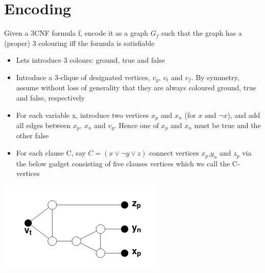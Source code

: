 \documentclass{article}[18pt]
\begin{document}
\section{Encoding}
Given a 3CNF formula f, encode it as a graph $G_f$ such that the graph has a (proper) 3 colouring iff the formula is satisfiable
\begin{itemize}
	\item Lets introduce 3 colours: ground, true and false
	\item Introduce a 3-clique of designated vertices, $v_g$, $v_t$ and $v_f$. By symmetry, assume without loss of generality that they are always coloured ground, true and false, respectively
	\item For each variable x, introduce two vertices $x_p$ and $x_n$ (for $x$ and $\lnot x$), and add all edges between $x_p$, $x_n$ and $v_g$. Hence one of $x_p$ and $x_n$ must be true and the other false
	\item For each clause C, say $C=(x\lor \lnot y \lor z)$ connect vertices $x_p$,$y_n$ and $z_p$ via the below gadget consisting of five clauses vertices which we call the C-vertices
\end{itemize}
\begin{center}
	\includegraphics[scale=0.7]{gadget}
\end{center}
\end{document}
